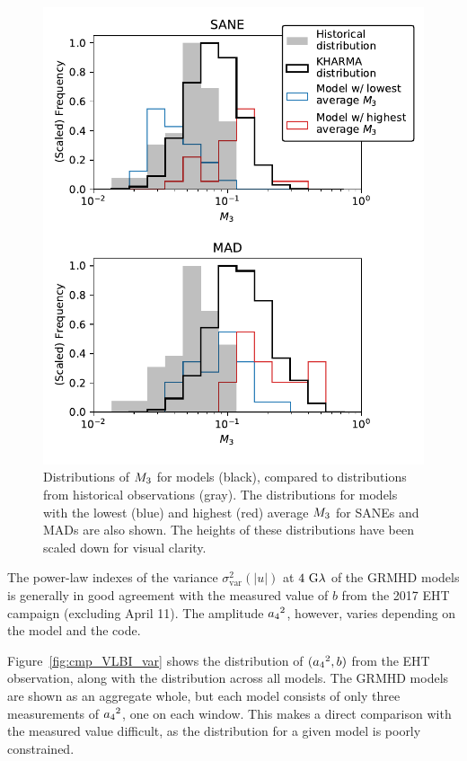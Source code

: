 \begin{figure}
  \centering
  \includegraphics[width=\columnwidth]{./figures/mi_hist.pdf}
  \caption{Distributions of $M_{3}$ for \kharma models (black), compared to distributions from historical observations (gray). The distributions for models with the lowest (blue) and highest (red) average $M_{3}$ for SANEs and MADs are also shown. The heights of these distributions have been scaled down for visual clarity.
  }
  \label{fig:cmp_ALMA_var}
\end{figure}


The power-law indexes of the variance $\sigma_\text{var}^2 (|u|)$ at $4~{\rm G}\lambda$ of the GRMHD models is generally in good agreement with the measured value of $b$ from the 2017 EHT campaign (excluding April 11). The amplitude ${a_4}^2$, however, varies depending on the model and the code.

Figure~\ref{fig:cmp_VLBI_var} shows the distribution of $({a_4}^2, b)$ from the EHT observation, along with the distribution across all \kharma models. The GRMHD models are shown as an aggregate whole, but each model consists of only three measurements of ${a_4}^2$, one on each window. This makes a direct comparison with the measured value difficult, as the distribution for a given model is poorly constrained.

